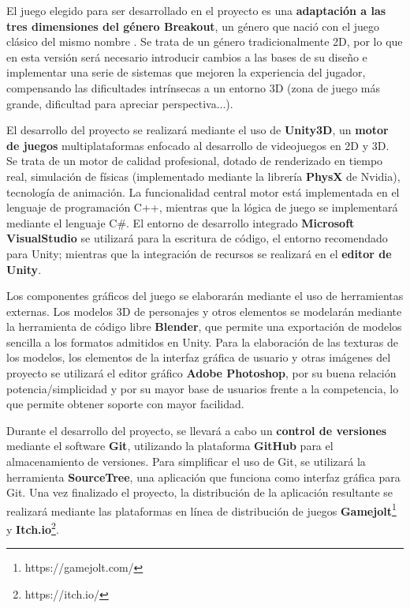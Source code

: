 El juego elegido para ser desarrollado en el proyecto es una \textbf{adaptación a las tres dimensiones del género Breakout}, un género que nació con el juego clásico del mismo nombre . Se trata de un género tradicionalmente 2D, por lo que en esta versión será necesario introducir cambios a las bases de su diseño e implementar una serie de sistemas que mejoren la experiencia del jugador, compensando las dificultades intrínsecas a un entorno 3D (zona de juego más grande, dificultad para apreciar perspectiva...). 

El desarrollo del proyecto se realizará mediante el uso de \textbf{Unity3D}, un \textbf{motor de juegos} multiplataformas enfocado al desarrollo de videojuegos en 2D y 3D. Se trata de un motor de calidad profesional, dotado de renderizado en tiempo real, simulación de físicas (implementado mediante la librería \textbf{PhysX} de Nvidia), tecnología de animación. La funcionalidad central motor está implementada en el lenguaje de programación C++, mientras que la lógica de juego se implementará mediante el lenguaje C\#. El entorno de desarrollo integrado \textbf{Microsoft VisualStudio} se utilizará para la escritura de código, el entorno recomendado para Unity; mientras que la integración de recursos se realizará en el \textbf{editor de Unity}.

Los componentes gráficos del juego se elaborarán mediante el uso de herramientas externas. Los modelos 3D de personajes y otros elementos se modelarán mediante la herramienta de código libre \textbf{Blender}, que permite una exportación de modelos sencilla a los formatos admitidos en Unity. Para la elaboración de las texturas de los modelos, los elementos de la interfaz gráfica de usuario y otras imágenes del proyecto se utilizará el editor gráfico \textbf{Adobe Photoshop}, por su buena relación potencia/simplicidad y por su mayor base de usuarios frente a la competencia, lo que permite obtener soporte con mayor facilidad.

Durante el desarrollo del proyecto, se llevará a cabo un \textbf{control de versiones} mediante el software \textbf{Git}, utilizando la plataforma \textbf{GitHub} para el almacenamiento de versiones. Para simplificar el uso de Git, se utilizará la herramienta \textbf{SourceTree}, una aplicación que funciona como interfaz gráfica para Git.  Una vez finalizado el proyecto, la distribución de la aplicación resultante se realizará mediante las plataformas en línea de distribución de juegos \textbf{Gamejolt}\footnote{https://gamejolt.com/} y \textbf{Itch.io}\footnote{https://itch.io/
}.
